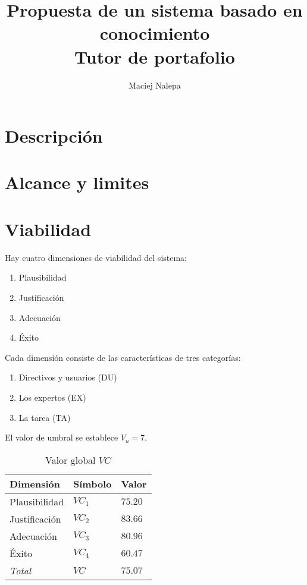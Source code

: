 \documentclass[a4paper,12pt]{article}
\title{Propuesta de un sistema basado en conocimiento\\ \normalsize{Tutor de portafolio}}
\author{Maciej Nalepa}
\begin{document}
\maketitle

\section{Descripción}

\section{Alcance y limites}

\section{Viabilidad}

\noindent Hay cuatro dimensiones de viabilidad del sistema:
\begin{enumerate}
	\item Plausibilidad
	\item Justificación
	\item Adecuación
	\item Éxito
\end{enumerate}

\noindent Cada dimensión consiste de las características de tres categorías:
\begin{enumerate}
	\item Directivos y usuarios (DU)
	\item Los expertos (EX)
	\item La tarea (TA)
\end{enumerate}

\noindent El valor de umbral se establece $V_u = 7$.

\begin{table}[h]
	\centering
	\begin{tabular}{|l|l|l|}
		\hline
		Dimensión	   & Símbolo & Valor 	 \\ \hline
		Plausibilidad  & $VC_1$  & $75.20$   \\
		Justificación  & $VC_2$  & $83.66$   \\
		Adecuación     & $VC_3$  & $80.96$   \\
		Éxito          & $VC_4$  & $60.47$   \\ \hline
		\textit{Total} & $VC$    & $75.07$   \\ \hline
	\end{tabular}
	\caption{Valor global $VC$}
	\label{tab:total}
\end{table}
\end{document}
